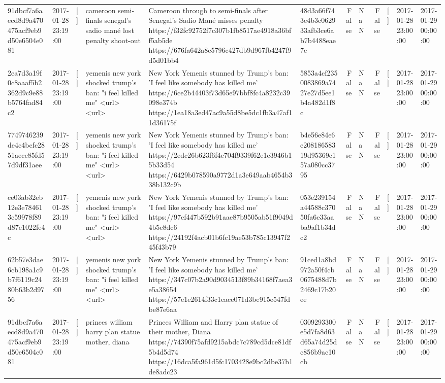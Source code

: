 \begin{tabular}{llllllrlrlll}
91dbcf7a6aecd8d9a470475acf9eb9d50e6504e081 & 2017-01-28 23:19:00 & [] & cameroon semi-finals senegal's sadio mané lost penalty shoot-out & Cameroon through to semi-finals after Senegal’s Sadio Mané misses penalty https://f32fc92752f7c307b1fb8517ae4918a36bff5ab5de https://676fa642a8c5796c427db9d967fb4247f9d5d01bb4 & 48d3a66f743e4b3c062933afb3ce6ab7b4488eae7e & False & NaN & False & [] & 2017-01-28 23:00:00 & 2017-01-29 00:00:00 \\
2ea7d3a19f0c8aaaf5b2362d9c9e88b5764fad84c2 & 2017-01-28 23:19:00 & [] & yemenis new york shocked trump's ban: "i feel killed me" <url> <url> & New York Yemenis stunned by Trump's ban: 'I feel like somebody has killed me' https://6ce2b44403f73d65e97bbf8fc4a8232c39098e374b https://1ea18a3ed47ac9a55d8be5dc1fb3a47af11d36175f & 5853a4cf2350083869a7427e27d5ee1b4a482d1f8c & False & NaN & False & [] & 2017-01-28 23:00:00 & 2017-01-29 00:00:00 \\
7749746239de4c4bcfc2851aecc85fd57d9df31aee & 2017-01-28 23:19:00 & [] & yemenis new york shocked trump's ban: "i feel killed me" <url> <url> & New York Yemenis stunned by Trump's ban: 'I feel like somebody has killed me' https://2edc26b623f6f4e704f9339f62e1e3946b15b33d54 https://6429b078590a9772d1a3e649aab4654b338b132c9b & b4e56e84e6e20818658319d95369c157a080cc3795 & False & NaN & False & [] & 2017-01-28 23:00:00 & 2017-01-29 00:00:00 \\
ce03ab32eb12e3e784613c59978f89d87e1022fe4c & 2017-01-28 23:19:00 & [] & yemenis new york shocked trump's ban: "i feel killed me" <url> <url> & New York Yemenis stunned by Trump's ban: 'I feel like somebody has killed me' https://97ef447b592b91aae87b9505ab51f9049d4b5e8dc6 https://24192f4acb01b6fc19ae53b785c13947f245f43b79 & 053e239154a44588c37050fa6e33aaba9af1b34dc2 & False & NaN & False & [] & 2017-01-28 23:00:00 & 2017-01-29 00:00:00 \\
62b57e3dae6cb198a1c9b7f6119c2480b63b2d9756 & 2017-01-28 23:19:00 & [] & yemenis new york shocked trump's ban: "i feel killed me" <url> <url> & New York Yemenis stunned by Trump's ban: 'I feel like somebody has killed me' https://347c07b2a90d9034513f89b34168f7aea3e5a38654 https://57e1e2614f33c1eace071d3be915e547fdbe87e6aa & 91ced1a8bd972a50f4cb0675488d7b2469c17b20ee & False & NaN & False & [] & 2017-01-28 23:00:00 & 2017-01-29 00:00:00 \\
91dbcf7a6aecd8d9a470475acf9eb9d50e6504e081 & 2017-01-28 23:19:00 & [] & princes william harry plan statue mother, diana & Princes William and Harry plan statue of their mother, Diana https://74390f75afd9215abdc7c789cd5dce81df5b4d5d74 https://16dca5fa961d5fc1703428e9bc2dbe37b1de8adc23 & 0309293300e5d7fa8d63d65a74d25dc856b9ac10cb & False & NaN & False & [] & 2017-01-28 23:00:00 & 2017-01-29 00:00:00 \\

\end{tabular}
